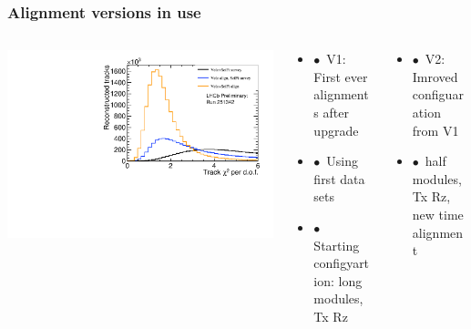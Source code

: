 \documentclass[aspectratio=1610, 12pt, xcolor=dvipsnames]{beamer}
\begin{document}
\begin{frame}\frametitle{Alignment versions in use}
  \begin{columns}
    \begin{column}[c]{0.4\textwidth}
      \centering
      \includegraphics[width=\textwidth]{logos/LHCb-FIGURE-2022-018/Run251342Preliminary_BestLong_chi2_per_ndof.pdf}
    \end{column}
    \begin{column}[c]{0.3\textwidth}
      \begin{itemize}
        \item $\bullet$\, V1: First ever alignments after upgrade
      	\item $\bullet$\, Using first data sets
        \item $\bullet$\, Starting configyartion: long modules, Tx Rz
      \end{itemize}
    \end{column}
    \begin{column}[c]{0.3\textwidth}
      \begin{itemize}
        \item $\bullet$\, V2: Imroved configuaration from V1 %
        \item $\bullet$\, half modules, Tx Rz, new time alignment
      \end{itemize}
    \end{column}
  \end{columns}
\end{frame}
\end{document}
